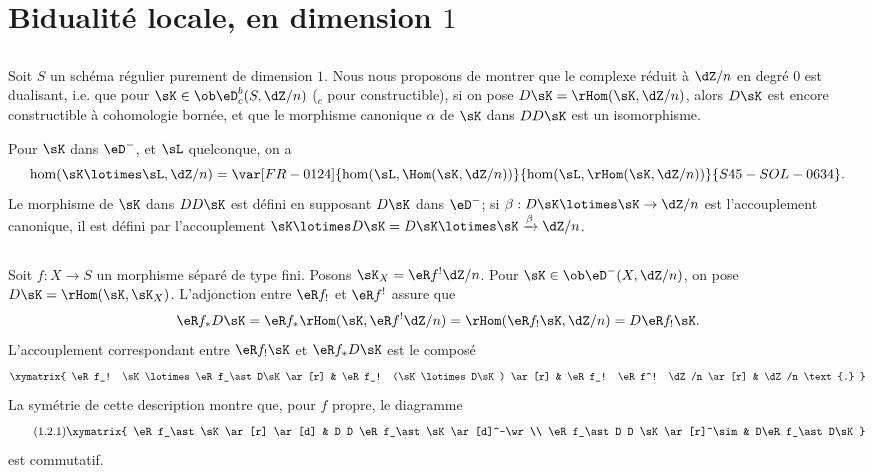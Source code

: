 \section{Bidualité locale, en dimension \texorpdfstring{$1$}{1}}\label{V:1}





\subsection{}\label{V:1-1}

Soit $S$ un schéma régulier purement de dimension $1$. Nous nous proposons 
de montrer que le complexe réduit à $\dZ/n$ en degré $0$ est 
dualisant, i.e. que pour $\sK\in \ob\eD_c^b(S,\dZ/n)$ (${}_c$ pour 
constructible), si on pose $D\sK=\rHom(\sK,\dZ/n)$, alors $D\sK$ est encore 
constructible à cohomologie bornée, et que le morphisme canonique $\alpha$ 
de $\sK$ dans $D D\sK$ est un isomorphisme. 

Pour $\sK$ dans $\eD^-$, et $\sL$ quelconque, on a 
\[
  \hom(\sK\lotimes \sL,\dZ/n) = \var[FR-0124]{\hom(\sL,\Hom(\sK,\dZ/n))}{\hom(\sL,\rHom(\sK,\dZ/n))}{S45-SOL-0634} \text{.}
\]
Le morphisme de $\sK$ dans $DD\sK$ est défini en supposant $D\sK$ dans 
$\eD^-$; si $\beta:D\sK\lotimes\sK\to \dZ/n$ est l'accouplement canonique, il 
est défini par l'accouplement 
$\sK\lotimes D\sK=D\sK\lotimes \sK \xrightarrow\beta \dZ/n$. 





\subsection{}\label{V:1-2}

Soit $f:X\to S$ un morphisme séparé de type fini. Posons 
$\sK_X=\eR f^!\dZ/n$. Pour $\sK\in \ob\eD^-(X,\dZ/n)$, on pose 
$D\sK = \rHom(\sK,\sK_X)$. L'adjonction entre $\eR f_!$ et $\eR f^!$ 
assure que
\[
  \eR f_\ast D\sK = \eR f_\ast \rHom(\sK,\eR f^! \dZ/n) = \rHom(\eR f_! \sK,\dZ/n) = D\eR f_! \sK \text{.}
\]
L'accouplement correspondant entre $\eR f_! \sK$ et $\eR f_\ast D\sK$ est le composé 
\[\xymatrix{
  \eR f_! \sK\lotimes \eR f_\ast D\sK \ar[r] 
    & \eR f_! (\sK\lotimes D\sK) \ar[r] 
    & \eR f_! \eR f^! \dZ/n \ar[r] 
    & \dZ/n \text{.}
}\]
La symétrie de cette description montre que, pour $f$ propre, le diagramme 
\begin{equation*}\tag{1.2.1}\label{V:eq:1-2-1}
\xymatrix{
  \eR f_\ast \sK \ar[r] \ar[d] 
    & D D \eR f_\ast \sK \ar[d]^-\wr \\
  \eR f_\ast D D \sK \ar[r]^\sim 
    & D\eR f_\ast D\sK
}
\end{equation*}
est commutatif. 

